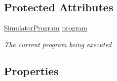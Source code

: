 \subsection*{Protected Attributes}
\begin{DoxyCompactItemize}
\item 
\hyperlink{class_c_p_u___o_s___simulator_1_1_c_p_u_1_1_simulator_program}{Simulator\+Program} \hyperlink{class_c_p_u___o_s___simulator_1_1_c_p_u_1_1_execution_unit_a192670bee8ca089c38e9989350f658d6}{program}
\begin{DoxyCompactList}\small\item\em The current program being executed \end{DoxyCompactList}\end{DoxyCompactItemize}
\subsection*{Properties}
